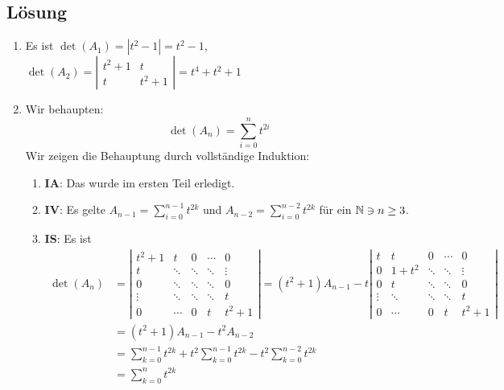 \subsection{Lösung}
\begin{enumerate}
	\item Es ist \( \det(A_1) = |t^2-1| = t^2-1 \), \( \det(A_2) = \left| \begin{smallmatrix}
		t^2+1 & t \\
		t & t^2+1
	\end{smallmatrix} \right| = t^4+t^2+1 \)

	\item Wir behaupten:
	\begin{equation*}
		\det(A_n) = \sum_{i = 0}^n t^{2i}
	\end{equation*}
	Wir zeigen die Behauptung durch vollständige Induktion:
	\begin{enumerate}
		\item \textbf{IA}: Das wurde im ersten Teil erledigt.
		\item \textbf{IV}: Es gelte \( A_{n-1} = \sum_{i = 0}^{n-1}t^{2k} \) und \( A_{n-2} = \sum_{i = 0}^{n-2}t^{2k} \) für ein  \( \mathbb{N} \ni n \geq 3 \).
		\item \textbf{IS}: Es ist
		\begin{align*}
			\det(A_n) &= \left| \begin{smallmatrix}
				t^2+1 & t & 0 & \cdots & 0 \\
				t & \ddots & \ddots & \ddots & \vdots \\
				0 & \ddots & \ddots & \ddots & 0 \\
				\vdots & \ddots & \ddots & \ddots & t \\
				0 & \cdots & 0 & t & t^2+1
			\end{smallmatrix} \right| = (t^2+1)A_{n-1} - t \left| \begin{smallmatrix}
				t & t & 0 & \cdots & 0 \\
				0 & 1+t^2 & \ddots & \ddots & \vdots \\
				0 & t & \ddots & \ddots & 0 \\
				\vdots & \ddots & \ddots & \ddots & t \\
				0 & \cdots & 0 & t & t^2+1
			\end{smallmatrix} \right| \\
			 &= (t^2+1)A_{n-1} - t^2A_{n-2} \\
			 &= \sum_{k = 0}^{n-1} t^{2k} + t^2\sum_{k = 0}^{n-1}t^{2k} - t^2\sum_{k = 0}^{n-2}t^{2k} \\
			 &= \sum_{k = 0}^n t^{2k}
		\end{align*}
	\end{enumerate}
\end{enumerate}

